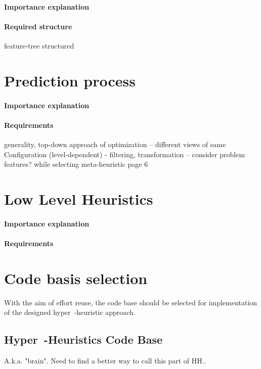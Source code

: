 \paragraph{Importance explanation}
\paragraph{Required structure} feature-tree structured



\section{Prediction process}\label{concept:prediction}
\paragraph{Importance explanation}
\paragraph{Requirements} generality, top-down approach of optimization
-- different views of same Configuration (level-dependent) - filtering, transformation
-- consider problem features? while selecting meta-heuristic \cite{surv:kerschke2019automated} page 6


\section{Low Level Heuristics}\label{concept:llh}
\paragraph{Importance explanation}
\paragraph{Requirements}



\section{Code basis selection}
With the aim of effort reuse, the code base should be selected for implementation of the designed hyper~-heuristic approach.

\subsection{Hyper~-Heuristics Code Base}\label{concept:hh code basis selection}
A.k.a. "brain". Need to find a better way to call this part of HH..
